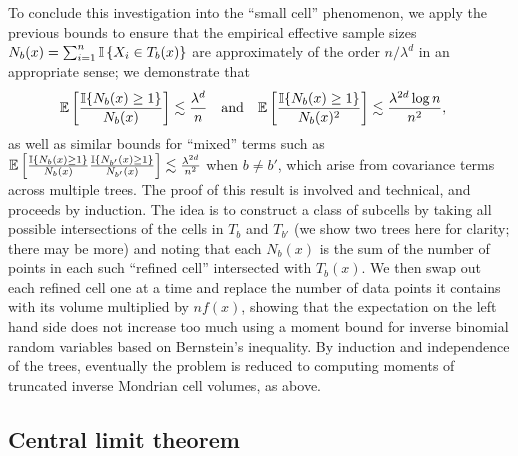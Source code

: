 To conclude this investigation into the ``small cell'' phenomenon,
we apply the previous bounds to
ensure that the empirical effective sample sizes
$N_b(x) = \sum_{i=1}^{n} \mathbb{I} \left\{ X_i \in T_b(x) \right\}$
are approximately of the order $n / \lambda^d$ in an appropriate sense;
we demonstrate that
%
\begin{align*}
  \mathbb{E}\left[
    \frac{\mathbb{I}\{N_b(x) \geq 1\}}{N_b(x)}
  \right]
  &\lesssim
  \frac{\lambda^d}{n}
  &&\text{and}
  &\mathbb{E}\left[
    \frac{\mathbb{I}\{N_b(x) \geq 1\}}{N_b(x)^2}
  \right]
  &\lesssim
  \frac{\lambda^{2d} \log n}{n^2},
\end{align*}
%
as well as similar bounds for ``mixed'' terms such as
%
$\mathbb{E} \left[
  \frac{\mathbb{I}\{N_b(x) \geq 1\}}{N_b(x)}
  \frac{\mathbb{I}\{N_{b'}(x) \geq 1\}}{N_{b'}(x)}
\right]
\lesssim \frac{\lambda^{2d}}{n^2}$
%
when $b \neq b'$, which arise from covariance terms across
multiple trees.
The proof of this result is involved and technical, and proceeds by
induction. The idea is to construct a class of subcells by taking
all possible intersections of the cells in $T_b$ and $T_{b'}$
(we show two trees here for clarity; there may be more)
and noting that each $N_b(x)$ is the sum of the number of points
in each such ``refined cell'' intersected with $T_b(x)$.
We then swap out each refined cell one at a time and replace
the number of data points it contains with its volume multiplied by $n f(x)$,
showing that the expectation on the left hand side does not increase too much
using a moment bound for inverse binomial random variables
based on Bernstein's inequality.
By induction and independence of the trees,
eventually the problem is reduced to computing moments
of truncated inverse Mondrian cell volumes, as above.

\subsection*{Central limit theorem}


